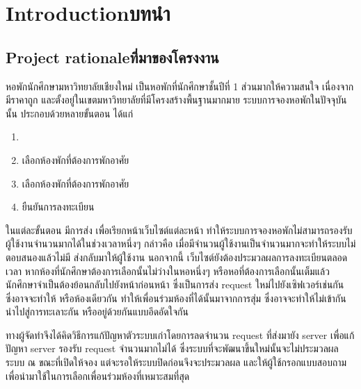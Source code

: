 \chapter{\ifenglish Introduction\else บทนำ\fi}

\section{\ifenglish Project rationale\else ที่มาของโครงงาน\fi}

หอพักนักศึกษามหาวิทยาลัยเชียงใหม่ เป็นหอพักที่นักศึกษาชั้นปีที่ 1 ส่วนมากให้ความสนใจ เนื่องจากมีราคาถูก และตั้งอยู่ในเขตมหาวิทยาลัยที่มีโครงสร้างพื้นฐานมากมาย
ระบบการจองหอพักในปัจจุบันนั้น ประกอบด้วยหลายขั้นตอน ได้แก่
\begin{enumerate}
\item {}
\item เลือกห้องพักที่ต้องการพักอาศัย
\item เลือกห้องพักที่ต้องการพักอาศัย
\item ยืนยันการลงทะเบียน
\end{enumerate}
ในแต่ละขั้นตอน มีการส่ง  เพื่อเรียกหน้าเว็บไซต์แต่ละหน้า ทำให้ระบบการจองหอพักไม่สามารถรองรับผู้ใช้งานจำนวนมากได้ในช่วงเวลาหนึ่งๆ กล่าวคือ เมื่อมีจำนวนผู้ใช้งานเป็นจำนวนมากจะทำให้ระบบไม่ตอบสนองแล้วไม่มี  ส่งกลับมาให้ผู้ใช้งาน
นอกจากนี้ เว็บไซต์ยังต้องประมวลผลการลงทะเบียนตลอดเวลา
หากห้องที่นักศึกษาต้องการเลือกนั้นไม่ว่างในหอหนึ่งๆ หรือหอที่ต้องการเลือกนั้นเต็มแล้ว นักศึกษาจำเป็นต้องย้อนกลับไปยังหน้าก่อนหน้า ซึ่งเป็นการส่ง request ใหม่ไปยังเซิฟเวอร์เช่นกัน
  ซึ่งอาจจะทำให้ หรือห้องเดียวกัน ทำให้เพื่อนร่วมห้องที่ได้นั้นมาจากการสุ่ม ซึ่งอาจจะทำให้ไม่เข้ากัน
นำไปสู่การทะเลาะกัน หรืออยู่ด้วยกันแบบอึดอัดใจกัน

ทางผู้จัดทำจึงได้คิดวิธีการแก้ปัญหาตัวระบบเก่าโดยการลดจำนวน request ที่ส่งมายัง server เพื่อแก้ปัญหา 
server รองรับ request จำนวนมากไม่ได้ ซึ่งระบบที่จะพัฒนาขึ้นใหม่นั้นจะไม่ประมวลผลระบบ ณ ขณะที่เปิดให้จอง
แต่จะรอให้ระบบปิดก่อนจึงจะประมวลผล และให้ผู้ใช้กรอกแบบสอบถามเพื่อนำมาใช้ในการเลือกเพื่อนร่วมห้องที่เหมาะสมที่สุด

